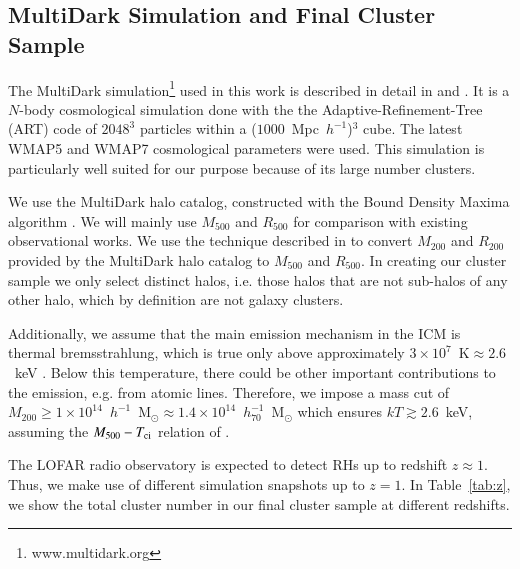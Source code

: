 \documentclass[traditabstract]{aa}
\newcommand{\rmn}{\mathrm}
\begin{document}
\subsection{MultiDark Simulation and Final Cluster Sample}
\label{sec:2.1}
The MultiDark simulation\footnote[3]{www.multidark.org} used in this work is
described in detail in \cite{2011arXiv1104.5130P} and
\cite{2011arXiv1109.0003R}.  It is a $N$-body cosmological simulation done with
the the Adaptive-Refinement-Tree (ART) code \citep{1997ApJS..111...73K} of
$2048^3$ particles within a ($1000$~Mpc~$h^{-1}$)$^3$ cube. The latest WMAP5 and
WMAP7 cosmological parameters were used. This simulation is particularly well
suited for our purpose because of its large number clusters.
 
We use the MultiDark halo catalog, constructed with the Bound Density Maxima
algorithm \citep{1997astro.ph.12217K}.  We will mainly use $M_{500}$ and
$R_{500}$ for comparison with existing observational works.  We use the
technique described in \cite{2003ApJ...584..702H} to convert $M_{200}$ and
$R_{200}$ provided by the MultiDark halo catalog to $M_{500}$ and $R_{500}$.  In
creating our cluster sample we only select distinct halos, i.e. those halos that
are not sub-halos of any other halo, which by definition are not galaxy clusters.

Additionally, we assume that the main emission mechanism in the ICM is thermal
bremsstrahlung, which is true only above approximately
$3\times10^{7}$~$\rmn{K}\approx2.6$~keV \citep{1988xrec.book.....S}. Below this
temperature, there could be other important contributions to the emission,
e.g. from atomic lines. Therefore, we impose a mass cut of
$M_{200}\geq1\times10^{14}$~$h^{-1}$~M$_{\odot}\approx1.4\times10^{14}$~$h_{70}^{-1}$~M$_{\odot}$
which ensures $kT \gtrsim 2.6$~keV, assuming the $M_{500} - T_{\rm{ci}}$ relation
of \cite{2010MNRAS.406.1773M}.

The LOFAR radio observatory is expected to detect RHs up to redshift $z \approx
1$. Thus, we make use of different simulation snapshots up to $z=1$. In
Table~\ref{tab:z}, we show the total cluster number in our final cluster sample
at different redshifts.
\end{document}
